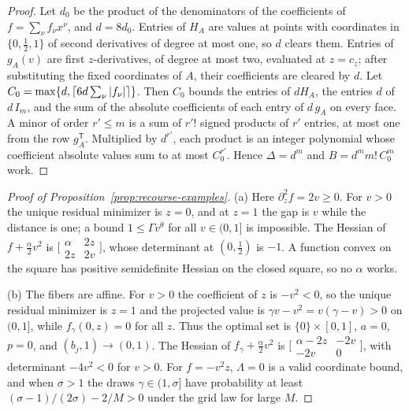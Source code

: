 \begin{proof}
Let $d_0$ be the product of the denominators of the coefficients of
$f=\sum_\nu f_\nu x^\nu$, and $d=8d_0$. Entries of $H_A$ are values at
points with coordinates in $\{0,\frac12,1\}$ of second derivatives of
degree at most one, so $d$ clears them. Entries of $g_A(v)$ are
first $z$-derivatives, of degree at most two, evaluated at $z=c_z$; after
substituting the fixed coordinates of $A$, their coefficients are
cleared by $d$. Let $C_0=\max\{d,\lceil6d\sum_\nu\left\lvert f_\nu\right\rvert\rceil\}$.
Then $C_0$ bounds the entries of $dH_A$, the entries $d$ of $d\,I_m$,
and the sum of the absolute coefficients of each entry of $d\,g_A$ on
every face. A minor of order $r'\le m$ is a sum of $r'!$ signed products
of $r'$ entries, at most one from the row $g_A^{\mathsf T}$. Multiplied
by $d^{r'}$, each product is an integer polynomial whose coefficient
absolute values sum to at most $C_0^{r'}$. Hence $\Delta=d^m$ and
$B=d^mm!\,C_0^m$ work.
\end{proof}

\begin{proof}[Proof of Proposition~\ref{prop:recourse-examples}]
(a) Here $\partial_z^2f=2v\ge0$. For $v>0$ the unique residual
minimizer is $z=0$, and at $z=1$ the gap is $v$ while the distance is
one; a bound $1\le\Gamma v^\theta$ for all $v\in(0,1]$ is impossible.
The Hessian of $f+\frac\alpha2v^2$ is
$\bigl[\begin{smallmatrix}\alpha&2z\\2z&2v\end{smallmatrix}\bigr]$, whose
determinant at $(0,\frac12)$ is $-1$. A function convex on the square
has positive semidefinite Hessian on the closed square, so no $\alpha$
works.

(b) The fibers are affine. For $v>0$ the coefficient of $z$ is
$-v^2<0$, so the unique residual minimizer is $z=1$ and the projected
value is $\gamma v-v^2=v(\gamma-v)>0$ on $(0,1]$, while $f_\gamma(0,z)=0$
for all $z$. Thus the optimal set is $\{0\}\times[0,1]$, $a=0$, $p=0$,
and $(b_j,1)\to(0,1)$. The Hessian of $f_\gamma+\frac\alpha2v^2$ is
$\bigl[\begin{smallmatrix}\alpha-2z&-2v\\-2v&0\end{smallmatrix}\bigr]$,
with determinant $-4v^2<0$ for $v>0$. For $f=-v^2z$, $\Lambda=0$ is a
valid coordinate bound, and when $\sigma>1$ the draws $\gamma\in(1,\sigma]$
have probability at least $(\sigma-1)/(2\sigma)-2/M>0$ under the grid
law for large $M$.
\end{proof}

